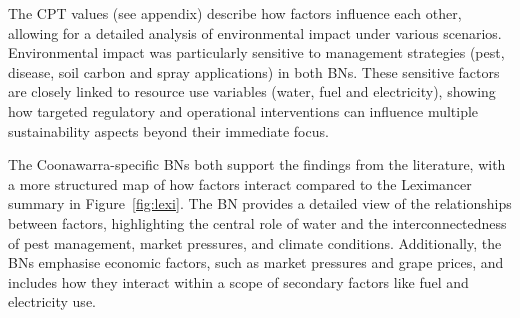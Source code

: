\documentclass[fleqn,10pt]{wlscirep}
\begin{document}
The CPT values (see appendix) describe how factors influence each other, allowing for a detailed analysis of environmental impact under various scenarios. Environmental impact was particularly sensitive to management strategies (pest, disease, soil carbon and spray applications) in both BNs. These sensitive factors are closely linked to resource use variables (water, fuel and electricity), showing how targeted regulatory and operational interventions can influence multiple sustainability aspects beyond their immediate focus. 

The Coonawarra-specific BNs both support the findings from the literature, with a more structured map of how factors interact compared to the Leximancer summary in Figure~\ref{fig:lexi}. The BN provides a detailed view of the relationships between factors, highlighting the central role of water and the interconnectedness of pest management, market pressures, and climate conditions. Additionally, the BNs emphasise economic factors, such as market pressures and grape prices, and includes how they interact within a scope of secondary factors like fuel and electricity use.






\end{document}

